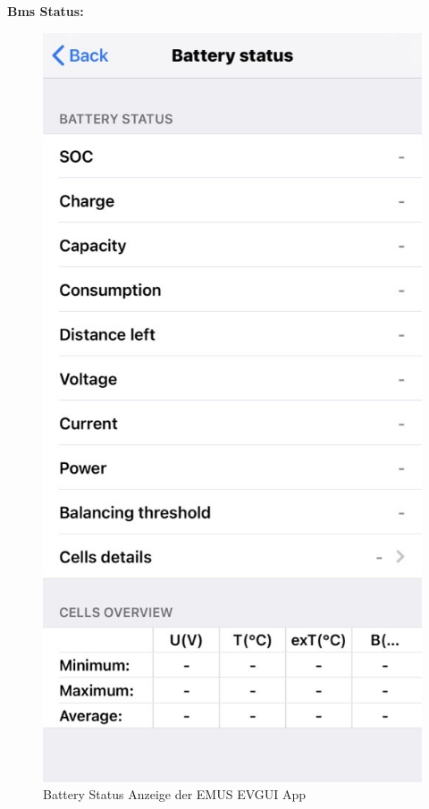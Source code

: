 \textbf{Bms Status:}

\begin{figure}[H]
	\begin{center}
		\includegraphics[scale=0.5]{figures/Akku/BMSBatteryStatus.png}
		\caption{Battery Status Anzeige der EMUS EVGUI App}
	\end{center}
\end{figure}


